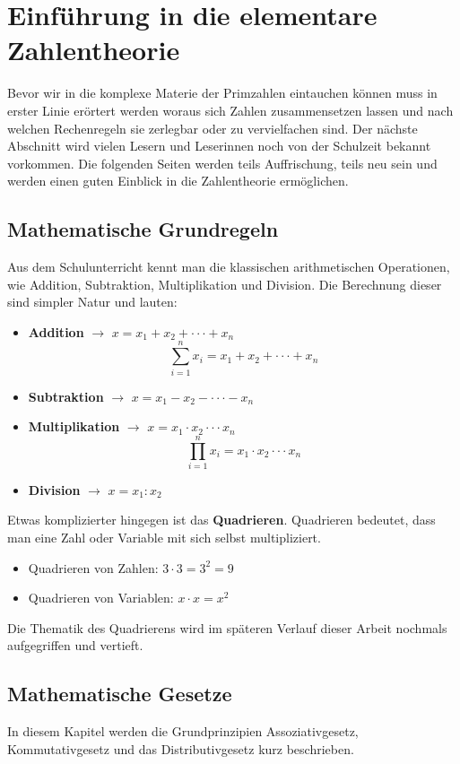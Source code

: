 \documentclass[12pt,a4paper]{article}
\theoremstyle{definition}
\begin{document}
\section{Einführung in die elementare Zahlentheorie}
Bevor wir in die komplexe Materie der Primzahlen eintauchen können muss in erster Linie erörtert werden woraus sich Zahlen zusammensetzen lassen und nach welchen Rechenregeln sie zerlegbar oder zu vervielfachen sind.
Der nächste Abschnitt wird vielen Lesern und Leserinnen noch von der Schulzeit bekannt vorkommen.
Die folgenden Seiten werden teils Auffrischung, teils neu sein und werden einen guten Einblick in die Zahlentheorie ermöglichen.

\subsection{Mathematische Grundregeln}\label{Mathematische Grundregeln}
Aus dem Schulunterricht kennt man die klassischen arithmetischen Operationen, wie Addition, Subtraktion, Multiplikation und Division.
Die Berechnung dieser sind simpler Natur und lauten:
\begin{itemize}
\item \textbf{Addition} $\to$ $x = x_{1} + x_{2} + \cdot\cdot\cdot + x_{n}$
\[\sum_{i=1}^n x_{i} = x_{1} + x_{2} +  \cdot\cdot\cdot + x_{n}\]

\item \textbf{Subtraktion} $\to$ $x = x_{1} - x_{2} - \cdot\cdot\cdot - x_{n}$

\item \textbf{Multiplikation} $\to$ $x = x_{1} \cdot x_{2} \cdot\cdot\cdot x_{n}$
\[\prod_{i=1}^n x_{i} = x_{1} \cdot x_{2} \cdot\cdot\cdot x_{n}\]

\item \textbf{Division} $\to$ $x = x_{1} : x_{2}$
\end{itemize}

Etwas komplizierter hingegen ist das \textbf{Quadrieren}.
Quadrieren bedeutet, dass man eine Zahl oder Variable mit sich selbst multipliziert.
\begin{itemize}
\item Quadrieren von Zahlen: $3 \cdot 3 = 3^2 = 9$
\item Quadrieren von Variablen: $x \cdot x = x^2$
\end{itemize}
Die Thematik des Quadrierens wird im späteren Verlauf dieser Arbeit nochmals aufgegriffen und vertieft.

\subsection{Mathematische Gesetze}
In diesem Kapitel werden die Grundprinzipien Assoziativgesetz, Kommutativgesetz und das Distributivgesetz kurz beschrieben.
\end{document}
